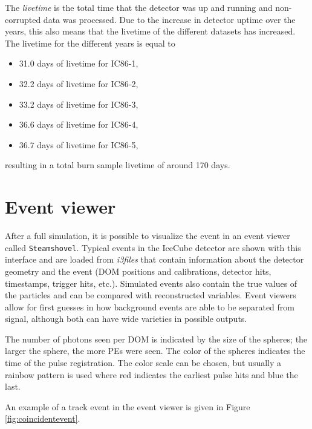 \noindent The \textit{livetime} is the total time that the detector was up and running and non-corrupted data was processed. Due to the increase in detector uptime over the years, this also means that the livetime of the different datasets has increased. The livetime for the different years is equal to
\vspace{2mm}
\begin{itemize}
\item 31.0 days of livetime for IC86-1,
\item 32.2 days of livetime for IC86-2,
\item 33.2 days of livetime for IC86-3,
\item 36.6 days of livetime for IC86-4,
\item 36.7 days of livetime for IC86-5,
\end{itemize}
\vspace{2mm}

\noindent resulting in a total burn sample livetime of around 170 days.

\section{Event viewer}
After a full simulation, it is possible to visualize the event in an event viewer called \texttt{Steamshovel}. Typical events in the IceCube detector are shown with this interface and are loaded from \textit{i3files} that contain information about the detector geometry and the event (DOM positions and calibrations, detector hits, timestamps, trigger hits, etc.). Simulated events also contain the true values of the particles and can be compared with reconstructed variables. Event viewers allow for first guesses in how background events are able to be separated from signal, although both can have wide varieties in possible outputs.

The number of photons seen per DOM is indicated by the size of the spheres; the larger the sphere, the more PEs were seen. The color of the spheres indicates the time of the pulse registration. The color scale can be chosen, but usually a rainbow pattern is used where red indicates the earliest pulse hits and blue the last. 

An example of a track event in the event viewer is given in Figure \ref{fig:coincidentevent}.